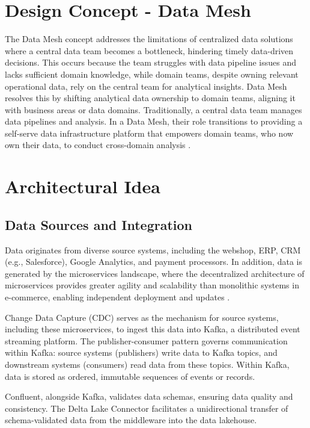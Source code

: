 \section{Design Concept - Data Mesh}
The Data Mesh concept addresses the limitations of centralized data solutions where a central data team becomes a bottleneck, hindering timely data-driven decisions. This occurs because the team struggles with data pipeline issues and lacks sufficient domain knowledge, while domain teams, despite owning relevant operational data, rely on the central team for analytical insights. Data Mesh resolves this by shifting analytical data ownership to domain teams, aligning it with business areas or data domains. Traditionally, a central data team manages data pipelines and analysis. In a Data Mesh, their role transitions to providing a self-serve data infrastructure platform that empowers domain teams, who now own their data, to conduct cross-domain analysis \parencite{Dehghani2022DataMesh, datamesh_architecture}.

\section{Architectural Idea}
\subsection{Data Sources and Integration}
Data originates from diverse source systems, including the webshop, ERP, CRM (e.g., Salesforce), Google Analytics, and payment processors. In addition, data is generated by the microservices landscape, where the decentralized architecture of microservices provides greater agility and scalability than monolithic systems in e-commerce, enabling independent deployment and updates \parencite{Francesco2017,Auer2021}.

Change Data Capture (CDC) serves as the mechanism for source systems, including these microservices, to ingest this data into Kafka, a distributed event streaming platform. The publisher-consumer pattern governs communication within Kafka: source systems (publishers) write data to Kafka topics, and downstream systems (consumers) read data from these topics. Within Kafka, data is stored as ordered, immutable sequences of events or records. 

Confluent, alongside Kafka, validates data schemas, ensuring data quality and consistency. The Delta Lake Connector facilitates a unidirectional transfer of schema-validated data from the middleware into the data lakehouse. 

